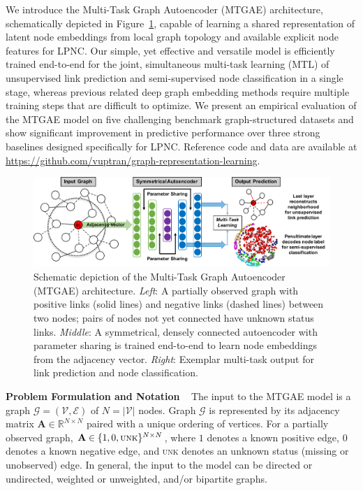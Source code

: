 \documentclass{article}
\begin{document}
We introduce the Multi-Task Graph Autoencoder (MTGAE) architecture, schematically depicted in Figure~\ref{fig1}, capable of learning a shared representation of latent node embeddings from local graph topology and available explicit node features for LPNC. Our simple, yet effective and versatile model is efficiently trained end-to-end for the joint, simultaneous multi-task learning (MTL) of unsupervised link prediction and semi-supervised node classification in a single stage, whereas previous related deep graph embedding methods require multiple training steps that are difficult to optimize. We present an empirical evaluation of the MTGAE model on five challenging benchmark graph-structured datasets and show significant improvement in predictive performance over three strong baselines designed specifically for LPNC. Reference code and data are available at \hbox{\url{https://github.com/vuptran/graph-representation-learning}}.

\begin{figure}[hb]
\centering
\includegraphics[width=\textwidth]{figure1.pdf}
\centering
\caption{Schematic depiction of the Multi-Task Graph Autoencoder (MTGAE) architecture. \emph{Left}: A partially observed graph with positive links (solid lines) and negative links (dashed lines) between two nodes; pairs of nodes not yet connected have unknown status links. \emph{Middle}: A symmetrical, densely connected autoencoder with parameter sharing is trained end-to-end to learn node embeddings from the adjacency vector. \emph{Right}: Exemplar multi-task output for link prediction and node classification.}
\label{fig1}
\end{figure}

\noindent \textbf{Problem Formulation and Notation} ~ The input to the MTGAE model is a graph $\mathcal{G} = (\mathcal{V}, \mathcal{E})$ of $N = |\mathcal{V}|$ nodes. Graph $\mathcal{G}$ is represented by its adjacency matrix $\mathbf{A} \in \mathbb{R}^{N \times N}$ paired with a unique ordering of vertices. For a partially observed graph, $\mathbf{A} \in \{1,0,\textsc{unk}\}^{N \times N}$, where $1$ denotes a known positive edge, $0$ denotes a known negative edge, and \textsc{unk} denotes an unknown status (missing or unobserved) edge. In general, the input to the model can be directed or undirected, weighted or unweighted, and/or bipartite graphs.
\end{document}
